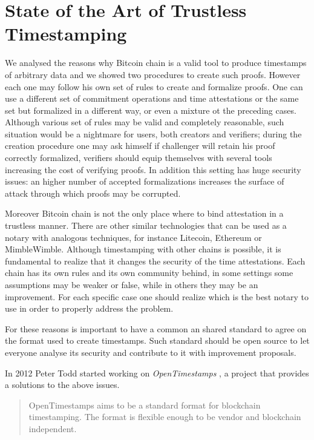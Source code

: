 \chapter{State of the Art of Trustless Timestamping}
\label{chpr:state-of-art}
We analysed the reasons why Bitcoin chain is a valid tool to produce timestamps of arbitrary data and we showed two procedures to create such proofs.
However each one may follow his own set of rules to create and formalize proofs. 
One can use a different set of commitment operations and time attestations or the same set but formalized in a different way, or even a mixture ot the preceding cases. 
Although various set of rules may be valid and completely reasonable, such situation would be a nightmare for users, both creators and verifiers; during the creation procedure one may ask himself if challenger will retain his proof correctly formalized, verifiers should equip themselves with several tools increasing the cost of verifying proofs.
In addition this setting has huge security issues: an higher number of accepted formalizations increases the surface of attack through which proofs may be corrupted. 

Moreover Bitcoin chain is not the only place where to bind attestation in a trustless manner. 
There are other similar technologies that can be used as a notary with analogous techniques, for instance Litecoin, Ethereum or MimbleWimble.
Although timestamping with other chains is possible, it is fundamental to realize that it changes the security of the time attestations.
Each chain has its own rules and its own community behind, in some settings some assumptions may be weaker or false, while in others they may be an improvement.
For each specific case one should realize which is the best notary to use in order to properly address the problem.

For these reasons is important to have a common an shared standard to agree on the format used to create timestamps. 
Such standard should be open source to let everyone analyse its security and contribute to it with improvement proposals.

In 2012 Peter Todd started working on \textit{OpenTimestamps} \cite{OTSWeb, OpenTimestampsGithub, OTSannouncment}, a project that provides a solutions to the above issues.

\begin{quotation}
	OpenTimestamps aims to be a standard format for blockchain timestamping. The format is flexible enough to be vendor and blockchain independent.
\end{quotation}

